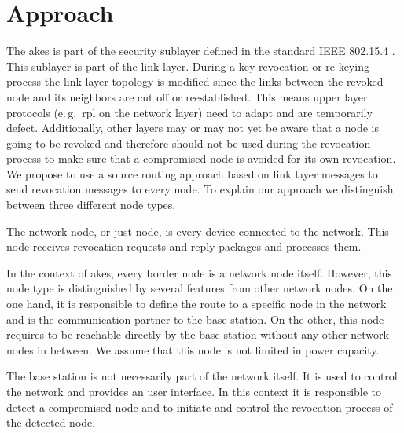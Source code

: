 \documentclass[conference]{IEEEtran}
\begin{document}
\section{Approach} \label{sec:approach}
The \acl{akes} is part of the security sublayer defined in the standard IEEE 802.15.4 \cite{ieee802.15.4}.
This sublayer is part of the link layer.
During a key revocation or re-keying process the link layer topology is modified since the links between the revoked node and its neighbors are cut off or reestablished.
This means upper layer protocols (e.\,g.~\ac{rpl} on the network layer) need to adapt and are temporarily defect.
Additionally, other layers may or may not yet be aware that a node is going to be revoked and therefore should not be used during the revocation process to make sure that a compromised node is avoided for its own revocation.
We propose to use a source routing approach based on link layer messages to send revocation messages to every node. 
To explain our approach we distinguish between three different node types.
\begin{description}[style=unboxed,leftmargin=0cm]
	\item[network node]
	The network node, or just node, is every device connected to the network. 
	This node receives revocation requests and reply packages and processes them.
	\item[border node]
	In the context of \ac{akes}, every border node is a network node itself.
	However, this node type is distinguished by several features from other network nodes.
	On the one hand, it is responsible to define the route to a specific node in the network and is the communication partner to the base station.
	On the other, this node requires to be reachable directly by the base station without any other network nodes in between.
	We assume that this node is not limited in power capacity.
	\item[base station]
	The base station is not necessarily part of the network itself. 
	It is used to control the network and provides an user interface. 
	In this context it is responsible to detect a compromised node and to initiate and control the revocation process of the detected node.
\end{description}
\end{document}
